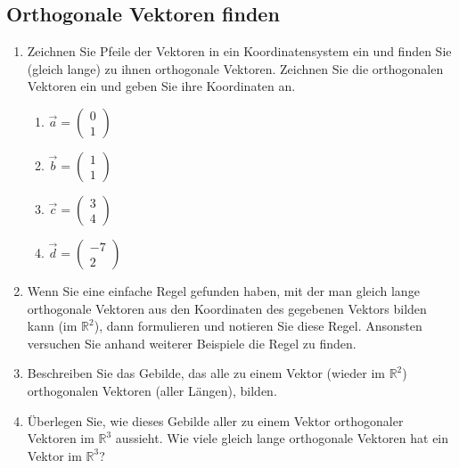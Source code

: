 \documentclass[12pt,a4paper,twoside,fleqn]{article}
\begin{document}
\subsection{Orthogonale Vektoren finden}
\begin{enumerate}
\item Zeichnen Sie Pfeile der Vektoren in ein Koordinatensystem ein und
  finden Sie (gleich lange) zu ihnen orthogonale Vektoren. Zeichnen
  Sie die orthogonalen Vektoren ein und geben Sie ihre Koordinaten
  an. 

  \begin{multicols}{4}
    \begin{enumerate}
    \item $\vec{a}=  
      \begin{pmatrix}
        0\\1
      \end{pmatrix}
      $
    \item $\vec{b}=  
      \begin{pmatrix}
        1\\1
      \end{pmatrix}
      $
    \item $\vec{c}=  
      \begin{pmatrix}
        3\\4
      \end{pmatrix}
      $
    \item $\vec{d}=  
      \begin{pmatrix}
        -7\\2
      \end{pmatrix}
      $
    \end{enumerate}
  \end{multicols}
\item Wenn Sie eine einfache Regel gefunden haben, mit der man gleich lange
  orthogonale Vektoren aus den Koordinaten des gegebenen Vektors bilden
  kann (im $\mathbb{R}^2$), dann formulieren und notieren Sie diese
  Regel. Ansonsten  versuchen Sie anhand weiterer Beispiele die Regel zu
  finden.
\item Beschreiben Sie das Gebilde, das alle zu einem Vektor (wieder im
  $\mathbb{R}^2$)  orthogonalen Vektoren (aller Längen), bilden.
\item Überlegen Sie, wie dieses Gebilde aller zu einem Vektor
  orthogonaler Vektoren im $\mathbb{R}^3$ aussieht. Wie viele gleich
  lange orthogonale Vektoren hat ein Vektor im $\mathbb{R}^3$?
\end{enumerate}
\end{document}
